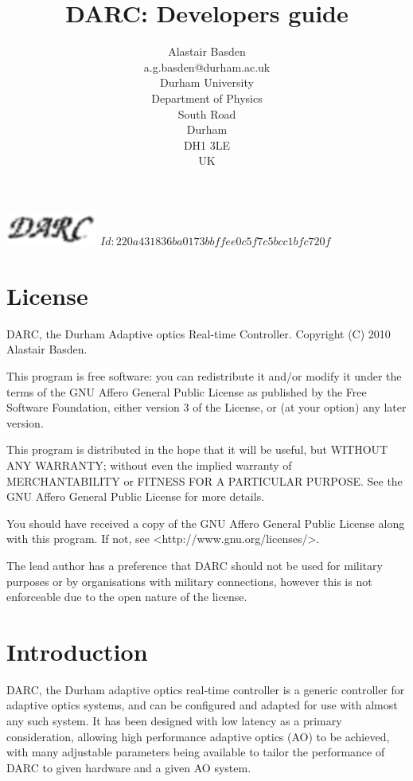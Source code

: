 \documentclass[a4,10pt]{article}
\title{DARC: Developers guide}
\author{Alastair Basden \\ a.g.basden@durham.ac.uk \\ Durham University \\ Department of Physics
  \\ South Road \\ Durham \\ DH1 3LE \\ UK}
\providecommand{\gitID}{$Id: 220a431836ba0173bbffee0c5f7c5bcc1bfc720f $}
\newcommand{\ao}{adaptive optics (AO)\renewcommand{\ao}{AO\xspace}\xspace}
\begin{document}
\maketitle
{\hspace{7cm} \includegraphics[width=3cm]{darclogo.eps}}
\vfill
\gitID
%

\pagebreak
\tableofcontents
\pagebreak
\section{License}
DARC, the Durham Adaptive optics Real-time Controller.
Copyright (C) 2010 Alastair Basden.

This program is free software: you can redistribute it and/or modify
it under the terms of the GNU Affero General Public License as
published by the Free Software Foundation, either version 3 of the
License, or (at your option) any later version.

This program is distributed in the hope that it will be useful,
but WITHOUT ANY WARRANTY; without even the implied warranty of
MERCHANTABILITY or FITNESS FOR A PARTICULAR PURPOSE.  See the
GNU Affero General Public License for more details.

You should have received a copy of the GNU Affero General Public License
along with this program.  If not, see <http://www.gnu.org/licenses/>.

The lead author has a preference that DARC should not be used for
military purposes or by organisations with military connections,
however this is not enforceable due to the open nature of the license.

\section{Introduction}
DARC, the Durham adaptive optics real-time controller is a generic
controller for adaptive optics systems, and can be configured and
adapted for use with almost any such system.  It has been designed
with low latency as a primary consideration, allowing high performance
\ao to be achieved, with many adjustable parameters being available to
tailor the performance of DARC to given hardware and a given \ao
system.
\end{document}
